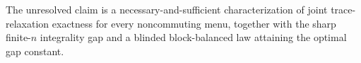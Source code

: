The unresolved claim is a necessary-and-sufficient characterization of joint trace-relaxation exactness for every noncommuting menu, together with the sharp finite-\(n\) integrality gap and a blinded block-balanced law attaining the optimal gap constant.